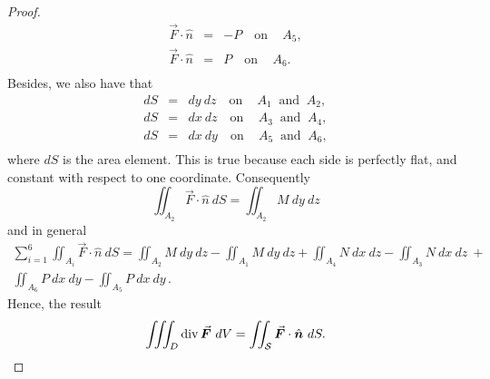 \begin{proof}
\begin{eqnarray*}
\vec{F}\cdot\hat{n}&=&-P\quad\text{on}\quad\,A_5,\\
\vec{F}\cdot\hat{n}&=&P\quad\text{on}\quad\,A_6.\\
\end{eqnarray*} 
Besides, we also have that
\begin{eqnarray*}
dS&=&dy\ dz\quad\text{on}\quad\,A_1\ \text{ and }\ A_2,\\
dS&=&dx\ dz\quad\text{on}\quad\,A_3\ \text{ and }\ A_4,\\
dS&=&dx\ dy\quad\text{on}\quad\,A_5\ \text{ and }\ A_6,\\
\end{eqnarray*} 
where $dS$ is the area element. This is true because each side is perfectly flat, and constant with respect to one coordinate. 
Consequently
$$
\displaystyle \iint_{A_2} \vec F\cdot\hat n \ dS=\displaystyle \iint_{A_2} M \ dy \ dz
$$
and in general
\begin{multline*}
\displaystyle \sum_{i = 1}^6 \iint_{A_i} \vec F\cdot\hat n \ dS=\displaystyle \iint_{A_2} M \ dy \  dz - \iint_{A_1} M \ dy \ dz + \iint_{A_4} N \ dx \ dz - \iint_{A_3} N \ dx \ dz\ +\\[0.2cm]
 \iint_{A_6} P \ dx \ dy - \iint_{A_5} P \ dx \ dy\,.
\end{multline*}
Hence, the result
$$\iiint_D \divv \vec F\ dV=\iint_\surfaceS \vec F\cdot\hat n\ dS .$$

\end{proof}

